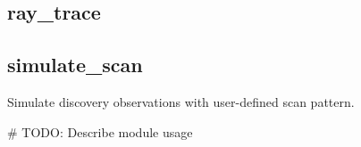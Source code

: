 \documentclass[letterpaper,10pt,english]{sphinxmanual}
\begin{document}
\subsection{ray\_trace}
\label{\detokenize{modules/ray_trace:ray-trace}}\label{\detokenize{modules/ray_trace::doc}}

\subsection{simulate\_scan}
\label{\detokenize{modules/simulate_scan:module-simulate_scan}}\label{\detokenize{modules/simulate_scan:simulate-scan}}\label{\detokenize{modules/simulate_scan::doc}}
Simulate discovery observations with user-defined scan pattern.

\# TODO: Describe module usage
\end{document}

